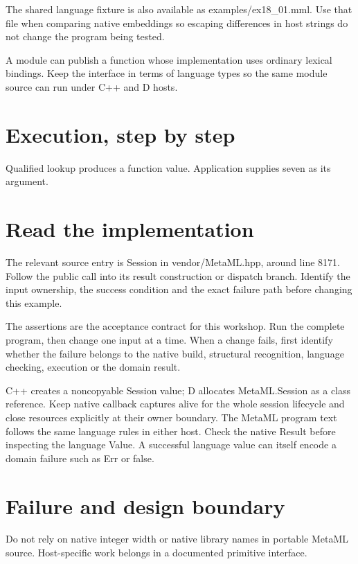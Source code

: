 The shared language fixture is also available as examples/ex18\_01.mml. Use that file when comparing native embeddings so escaping differences in host strings do not change the program being tested.

\clearpage
{}
A module can publish a function whose implementation uses ordinary lexical bindings. Keep the interface in terms of language types so the same module source can run under C++ and D hosts.


\section*{Execution, step by step}
Qualified lookup produces a function value. Application supplies seven as its argument.

\section*{Read the implementation}
The relevant source entry is Session in vendor/MetaML.hpp, around line 8171. Follow the public call into its result construction or dispatch branch. Identify the input ownership, the success condition and the exact failure path before changing this example.

The assertions are the acceptance contract for this workshop. Run the complete program, then change one input at a time. When a change fails, first identify whether the failure belongs to the native build, structural recognition, language checking, execution or the domain result.

\clearpage
{}
C++ creates a noncopyable Session value; D allocates MetaML.Session as a class reference. Keep native callback captures alive for the whole session lifecycle and close resources explicitly at their owner boundary. The MetaML program text follows the same language rules in either host. Check the native Result before inspecting the language Value. A successful language value can itself encode a domain failure such as Err or false.


\section*{Failure and design boundary}
Do not rely on native integer width or native library names in portable MetaML source. Host-specific work belongs in a documented primitive interface.

